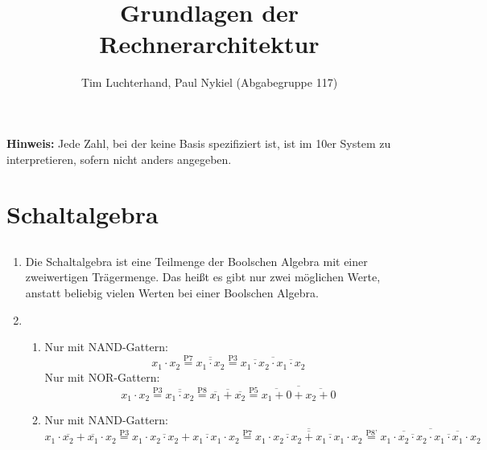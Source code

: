 \documentclass[DIN, pagenumber=false, fontsize=11pt, parskip=half]{scrartcl}
\title{Grundlagen der Rechnerarchitektur}
\author{Tim Luchterhand, Paul Nykiel (Abgabegruppe 117)}
\begin{document}
    \maketitle
    \textbf{Hinweis: } Jede Zahl, bei der keine Basis spezifiziert ist, ist im 10er System zu interpretieren, sofern nicht anders angegeben.
    \section{Schaltalgebra}
    \subsection{}
    \begin{enumerate}[label = (\alph*)]
        \item Die Schaltalgebra ist eine Teilmenge der Boolschen Algebra mit einer zweiwertigen Trägermenge. 
            Das heißt es gibt nur zwei möglichen Werte, anstatt beliebig vielen Werten bei einer Boolschen Algebra.
        \item 
            \begin{enumerate}[label = (\roman*)]
                \item 
                    Nur mit NAND-Gattern:
                    \begin{equation*}
                        x_1 \cdot x_2 \stackrel{\text{P7}}{=} \overline{\overline{x_1 \cdot x_2}} \stackrel{\text{P3}}{=} \overline{\overline{x_1 \cdot x_2} \cdot \overline{x_1 \cdot x_2}}
                    \end{equation*}
                    Nur mit NOR-Gattern:
                    \begin{equation*}
                        x_1 \cdot x_2 \stackrel{\text{P3}}{=} \overline{\overline{x_1 \cdot x_2}} \stackrel{\text{P8}}{=} \overline{\overline{x_1} + \overline{x_2}} \stackrel{\text{P5}}{=} \overline{\overline{x_1 + 0} + \overline{x_2 + 0}}
                    \end{equation*}
                \item
                    Nur mit NAND-Gattern:
                    \begin{equation*}
                        x_1 \cdot \overline{x_2} + \overline{x_1} \cdot x_2 \stackrel{\text{P3}}{=} x_1 \cdot \overline{x_2 \cdot x_2} + \overline{x_1 \cdot x_1} \cdot x_2  
                        \stackrel{\text{P7}}{=} \overline{\overline{x_1 \cdot \overline{x_2 \cdot x_2} + \overline{x_1 \cdot x_1} \cdot x_2}}
                        \stackrel{\text{P8'}}{=} \overline{\overline{x_1 \cdot \overline{x_2 \cdot x_2}} \cdot \overline{ \overline{x_1 \cdot x_1} \cdot x_2}}

\end{equation*}
\end{enumerate}
\end{enumerate}
\end{document}
